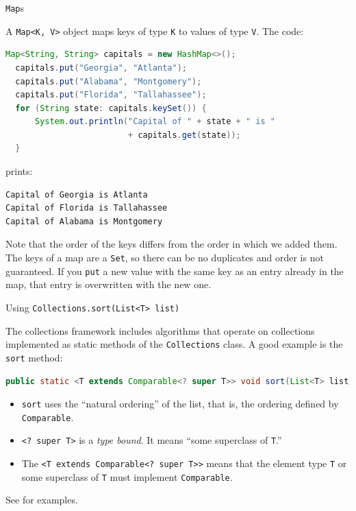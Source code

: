 \documentclass{beamer}
\begin{document}
\begin{frame}[fragile]{{\tt Map}s}

\vspace{-.05in}
A {\tt Map<K, V>} object maps keys of type {\tt K} to values of type {\tt V}.  The code:
\vspace{-.05in}
\begin{lstlisting}[language=Java]
  Map<String, String> capitals = new HashMap<>();
  capitals.put("Georgia", "Atlanta");
  capitals.put("Alabama", "Montgomery");
  capitals.put("Florida", "Tallahassee");
  for (String state: capitals.keySet()) {
      System.out.println("Capital of " + state + " is "
                         + capitals.get(state));
  }
\end{lstlisting}
\vspace{-.05in}
prints:
\vspace{-.05in}
\begin{lstlisting}[language=Java]
Capital of Georgia is Atlanta
Capital of Florida is Tallahassee
Capital of Alabama is Montgomery
\end{lstlisting}
\vspace{-.05in}
Note that the order of the keys differs from the order in which we added them.  The keys of a map are a {\tt Set}, so there can be no duplicates and order is not guaranteed.  If you {\tt put} a new value with the same key as an entry already in the map, that entry is overwritten with the new one.

\end{frame}


\begin{frame}[fragile]{Using {\tt Collections.sort(List<T> list)}}


The collections framework includes algorithms that operate on collections implemented as static methods of the {\tt Collections} class.  A good example is the {\tt sort} method:
\begin{lstlisting}[language=Java]
public static <T extends Comparable<? super T>> void sort(List<T> list)
\end{lstlisting}

\begin{itemize}
\item {\tt sort} uses the ``natural ordering'' of the list, that is, the ordering defined by {\tt Comparable}.
\item {\tt <? super T>} is a {\it type bound}.  It means ``some superclass of {\tt T}.''
\item The {\tt <T extends Comparable<? super T>>} means that the element type {\tt T} or some superclass of {\tt T} must implement {\tt Comparable}.
\end{itemize}

See  for examples.

\end{frame}
\end{document}
